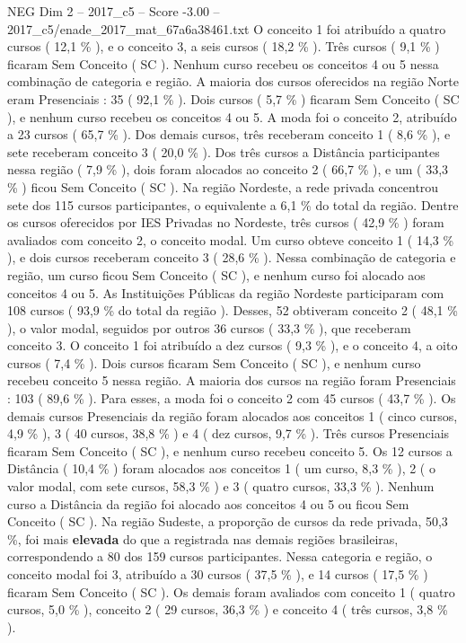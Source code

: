 \begin{textsample}{NEG Dim 2 – 2017\_c5 – Score -3.00 – 2017\_c5/enade\_2017\_mat\_67a6a38461.txt}
O conceito 1 foi atribuído a quatro cursos ( 12,1 \% ), e o conceito 3, a seis cursos ( 18,2 \% ).
Três cursos ( 9,1 \% ) ficaram Sem Conceito ( SC ).
Nenhum curso recebeu os conceitos 4 ou 5 nessa combinação de categoria e região.
A maioria dos cursos oferecidos na região Norte eram Presenciais : 35 ( 92,1 \% ).
Dois cursos ( 5,7 \% ) ficaram Sem Conceito ( SC ), e nenhum curso recebeu os conceitos 4 ou 5.
A moda foi o conceito 2, atribuído a 23 cursos ( 65,7 \% ).
Dos demais cursos, três receberam conceito 1 ( 8,6 \% ), e sete receberam conceito 3 ( 20,0 \% ).
Dos três cursos a Distância participantes nessa região ( 7,9 \% ), dois foram alocados ao conceito 2 ( 66,7 \% ), e um ( 33,3 \% ) ficou Sem Conceito ( SC ).
Na região Nordeste, a rede privada concentrou sete dos 115 cursos participantes, o equivalente a 6,1 \% do total da região.
Dentre os cursos oferecidos por IES Privadas no Nordeste, três cursos ( 42,9 \% ) foram avaliados com conceito 2, o conceito modal.
Um curso obteve conceito 1 ( 14,3 \% ), e dois cursos receberam conceito 3 ( 28,6 \% ).
Nessa combinação de categoria e região, um curso ficou Sem Conceito ( SC ), e nenhum curso foi alocado aos conceitos 4 ou 5.
As Instituições Públicas da região Nordeste participaram com 108 cursos ( 93,9 \% do total da região ).
Desses, 52 obtiveram conceito 2 ( 48,1 \% ), o valor modal, seguidos por outros 36 cursos ( 33,3 \% ), que receberam conceito 3.
O conceito 1 foi atribuído a dez cursos ( 9,3 \% ), e o conceito 4, a oito cursos ( 7,4 \% ).
Dois cursos ficaram Sem Conceito ( SC ), e nenhum curso recebeu conceito 5 nessa região.
A maioria dos cursos na região foram Presenciais : 103 ( 89,6 \% ).
Para esses, a moda foi o conceito 2 com 45 cursos ( 43,7 \% ).
Os demais cursos Presenciais da região foram alocados aos conceitos 1 ( cinco cursos, 4,9 \% ), 3 ( 40 cursos, 38,8 \% ) e 4 ( dez cursos, 9,7 \% ).
Três cursos Presenciais ficaram Sem Conceito ( SC ), e nenhum curso recebeu conceito 5.
Os 12 cursos a Distância ( 10,4 \% ) foram alocados aos conceitos 1 ( um curso, 8,3 \% ), 2 ( o valor modal, com sete cursos, 58,3 \% ) e 3 ( quatro cursos, 33,3 \% ).
Nenhum curso a Distância da região foi alocado aos conceitos 4 ou 5 ou ficou Sem Conceito ( SC ).
Na região Sudeste, a proporção de cursos da rede privada, 50,3 \%, foi mais \textbf{elevada} do que a registrada nas demais regiões brasileiras, correspondendo a 80 dos 159 cursos participantes.
Nessa categoria e região, o conceito modal foi 3, atribuído a 30 cursos ( 37,5 \% ), e 14 cursos ( 17,5 \% ) ficaram Sem Conceito ( SC ).
Os demais foram avaliados com conceito 1 ( quatro cursos, 5,0 \% ), conceito 2 ( 29 cursos, 36,3 \% ) e conceito 4 ( três cursos, 3,8 \% ).

\end{textsample}
